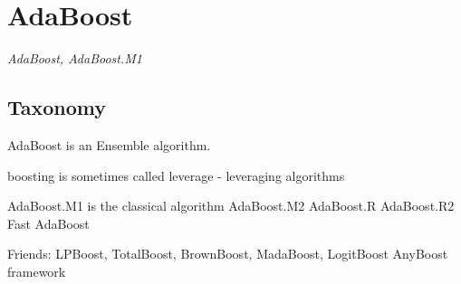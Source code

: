 
\section{AdaBoost} 
\label{sec:adaboost}

\emph{AdaBoost, AdaBoost.M1}

\subsection{Taxonomy}
AdaBoost is an Ensemble algorithm.

boosting is sometimes called leverage - leveraging algorithms

AdaBoost.M1 is the classical algorithm
AdaBoost.M2
AdaBoost.R
AdaBoost.R2
Fast AdaBoost


Friends: LPBoost, TotalBoost, BrownBoost, MadaBoost, LogitBoost
AnyBoost framework

